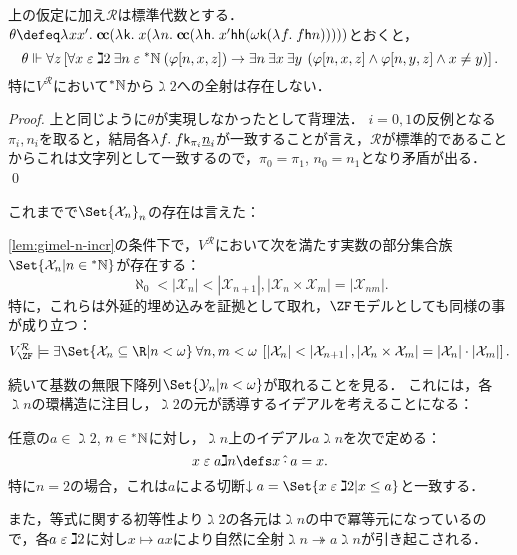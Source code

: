 \documentclass[realisability.tex]{subfiles}
\begin{document}
\begin{lemma}
 上の仮定に加え$\mathcal{R}$は標準代数とする．
 $\theta \defeq \abs{x x'}{\cc(\abs{\conti}{x(\abs{n}{\cc(\abs{\mathsf{h}}{x'\mathsf{h}\mathsf{h}(\omega \conti (\abs{f}{f\mathsf{h}n}))})})})}$とおくと，
 \[
 \theta \Vdash \forall z \left[ \forall x \mathrel{\varepsilon} \gimel 2 \: \exists n \mathrel{\varepsilon} \mathord{{}^{*}\mathbb{N}} \: ( \varphi[n, x, z]) \to \exists n\: \exists x\: \exists y\: \left(\varphi[n, x, z] \land  \varphi[n, y, z] \land x \neq y\right)  \right].
 \]
 特に$V^{\mathcal{R}}$において$\mathord{{}^{*}\mathbb{N}}$から$\gimel 2$への全射は存在しない．
\end{lemma}
\begin{proof}
 上と同じように$\theta$が実現しなかったとして背理法．
 $i = 0, 1$の反例となる$\pi_i, n_i$を取ると，結局各$\lambda^{\mathsf{}}f.\;f \mathsf{k}_{\pi_i} \underline{n}_i$が一致することが言え，$\mathcal{R}$が標準的であることからこれは文字列として一致するので，$\pi_0 = \pi_1$, $n_0 = n_1$となり矛盾が出る． \qed
\end{proof}

これまでで$\Set{\mathcal{X}_n}_n$の存在は言えた：
\begin{corollary}
 \cref{lem:gimel-n-incr}の条件下で，$V^{\mathcal{R}}$において次を満たす実数の部分集合族$\Set{\mathcal{X}_n | n \in \NN}$が存在する：
 \[
  \aleph_0 < |\mathcal{X}_n| < |\mathcal{X}_{n+1}|, |\mathcal{X}_n \times \mathcal{X}_m| = |\mathcal{X}_{n m}|.
 \]
 特に，これらは外延的埋め込みを証拠として取れ，$\ZF$モデルとしても同様の事が成り立つ：
 \[
  V^{\mathcal{R}}_{\ZF} \models \exists \Set{ \mathcal{X}_n \subseteq \R | n < \omega} \: \forall n, m < \omega \: \left[ \left|\mathcal{X}_{n}\right| < \left|\mathcal{X}_{n+1}\right|, \left|\mathcal{X}_{n} \times \mathcal{X}_m\right| = \left|\mathcal{X}_n\right| \cdot \left|\mathcal{X}_m\right| \right].
 \]
\end{corollary}

続いて基数の無限下降列$\Set{\mathcal{Y}_n | n < \omega}$が取れることを見る．
これには，各$\gimel n$の環構造に注目し，$\gimel 2$の元が誘導するイデアルを考えることになる：
\begin{definition}
 任意の$a \in \gimel 2$, $n \in \mathord{{}^{*}\mathbb{N}}$に対し，$\gimel n$上のイデアル$a\gimel n$を次で定める：
 \[
  x \strin a \gimel n \defs x \mathbin{\hat{\cdot}} a = x.
 \]
 特に$n = 2$の場合，これは$a$による切断$\downarrow a = \Set{x \strin \gimel 2| x \leq a}$と一致する．

 また，等式に関する初等性より$\gimel 2$の各元は$\gimel n$の中で冪等元になっているので，各$a \mathrel{\varepsilon} \gimel 2$に対し$x \mapsto a x$により自然に全射$\gimel n \twoheadrightarrow a \gimel n$が引き起こされる．
\end{definition}
\end{document}
